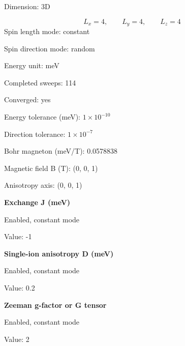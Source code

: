 \documentclass[12pt,a4paper]{article}
\numberwithin{equation}{section}
\numberwithin{figure}{section}
\numberwithin{table}{section}
\begin{document}
	
Dimension: 3D\par
\[
L_x = 4,\qquad L_y = 4,\qquad L_z = 4
\]
Spin length mode: constant\par
Spin direction mode: random\par
Energy unit: meV\par
Completed sweeps: 114\par
Converged: yes\par
Energy tolerance (meV): $1\times 10^{-10}$\par
Direction tolerance: $1\times 10^{-7}$\par
Bohr magneton (meV/T): 0.0578838\par
Magnetic field B (T): (0, 0, 1)\par
Anisotropy axis: (0, 0, 1)\par

\par\medskip\noindent\textbf{Exchange J (meV)}\par
Enabled, constant mode\par
Value: -1\par

\par\medskip\noindent\textbf{Single-ion anisotropy D (meV)}\par
Enabled, constant mode\par
Value: 0.2\par

\par\medskip\noindent\textbf{Zeeman g-factor or G tensor}\par
Enabled, constant mode\par
Value: 2\par
	
	\clearpage
	
\end{document}
